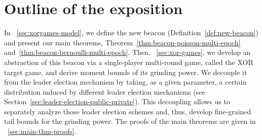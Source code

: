 \section{Outline of the exposition}
In \Section~\ref{sec:xorgames-model}, 
we define the new beacon (Definition~\ref{def:new-beacon}) and present our main theorems, 
Theorem~\ref{thm:beacon-poisson-multi-epoch} 
and~\ref{thm:beacon-bernoulli-multi-epoch}. 
Then, \Section~\ref{sec:xor-games}, we develop an abstraction of this beacon 
via a single-player multi-round game, called the XOR target game, 
and derive moment bounds of its grinding power. 
We decouple it from the leader election mechanism by taking,
as a given parameter, 
a certain distribution induced by different leader election mechanisms 
(see Section~\ref{sec:leader-election-public-private}). 
This decoupling allows us to separately analyze those leader election schemes 
and, thus, develop fine-grained 
tail bounds for the grinding power. 
The proofs of the main theorems are given in \Section~\ref{sec:main-thm-proofs}.




